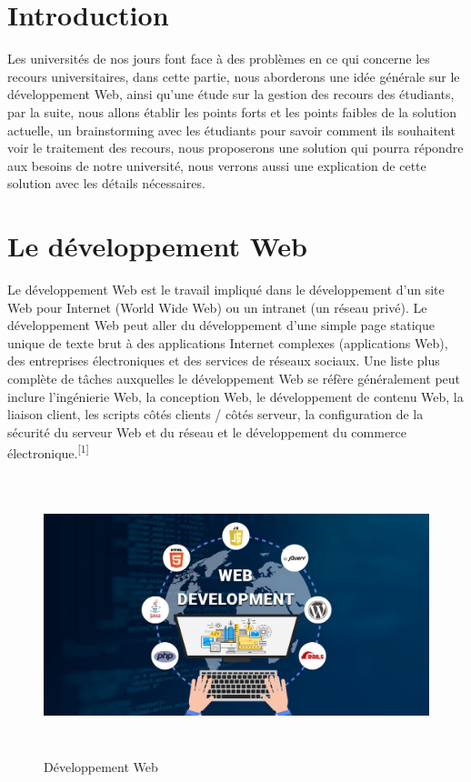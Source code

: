 \documentclass[12pt]{report}
\begin{document}
\section{Introduction}
\vspace{0.2in}
Les universités de nos jours font face à des problèmes en ce qui concerne les recours universitaires, dans cette partie, nous aborderons une idée générale sur le développement Web, ainsi qu'une étude sur la gestion des recours des étudiants, par la suite, nous allons établir les points forts et les points faibles de la solution actuelle, un brainstorming avec les étudiants pour savoir comment ils souhaitent voir le traitement des recours, nous proposerons une solution qui pourra répondre aux besoins de notre université, nous verrons aussi une explication de cette solution avec les détails nécessaires.


\section{Le développement Web}
\vspace{0.2in}
Le développement Web est le travail impliqué dans le développement d'un site Web pour Internet (World Wide Web) ou un intranet (un réseau privé). Le développement Web peut aller du développement d'une simple page statique unique de texte brut à des applications Internet complexes (applications Web), des entreprises électroniques et des services de réseaux sociaux. Une liste plus complète de tâches auxquelles le développement Web se réfère généralement peut inclure l'ingénierie Web, la conception Web, le développement de contenu Web, la liaison client, les scripts côtés clients / côtés serveur, la configuration de la sécurité du serveur Web et du réseau et le développement du commerce électronique.\textsuperscript{[1]}

\vspace{0.3in}

\begin{figure}[h]
\centering
    \includegraphics[width = 6in, height = 3.2in]{../Images/webDev.jpeg}
\caption{Développement Web}
\end{figure}
\end{document}

